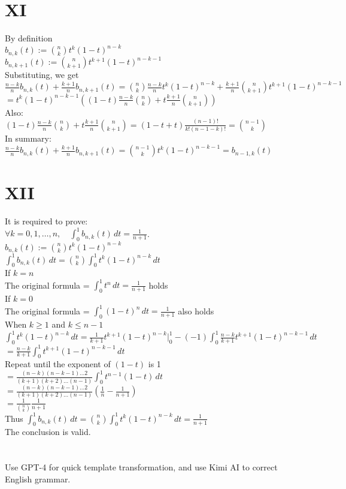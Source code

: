 \documentclass[a4paper]{article}
\begin{document}
\section*{XI}
By definition\\
\( b_{n,k}(t) := \binom{n}{k} t^k (1-t)^{n-k} \)\\
\( b_{n,k+1}(t) := \binom{n}{k+1} t^{k+1} (1-t)^{n-k-1} \)\\
Substituting, we get\\
\( \frac{n-k}{n} b_{n,k}(t) + \frac{k+1}{n} b_{n,k+1}(t) = \binom{n}{k} \frac{n-k}{n} t^k (1-t)^{n-k} + \frac{k+1}{n} \binom{n}{k+1} t^{k+1} (1-t)^{n-k-1} \)\\
\( = t^k (1-t)^{n-k-1} \left((1-t) \frac{n-k}{n} \binom{n}{k} + t \frac{k+1}{n} \binom{n}{k+1}\right) \)\\
Also:\\
\( (1-t) \frac{n-k}{n} \binom{n}{k} + t \frac{k+1}{n} \binom{n}{k+1} = (1-t+t) \frac{(n-1)!}{k!(n-1-k)!} = \binom{n-1}{k} \)\\
In summary:\\
\( \frac{n-k}{n} b_{n,k}(t) + \frac{k+1}{n} b_{n,k+1}(t) = \binom{n-1}{k} t^k (1-t)^{n-k-1} = b_{n-1,k}(t) \)\\

\section*{XII}
It is required to prove:\\
\( \forall k = 0, 1, \ldots, n, \quad \int_{0}^{1} b_{n,k}(t) \, dt = \frac{1}{n+1} \).\\
\( b_{n,k}(t) := \binom{n}{k} t^k (1-t)^{n-k} \)\\
\( \int_{0}^{1} b_{n,k}(t) \, dt = \binom{n}{k} \int_{0}^{1} t^k (1-t)^{n-k} \, dt \)\\
If \( k = n \)\\
The original formula = \( \int_{0}^{1} t^n \, dt = \frac{1}{n+1} \) holds\\
If \( k = 0 \)\\
The original formula = \( \int_{0}^{1} (1-t)^n \, dt = \frac{1}{n+1} \) also holds\\
When \( k \geq 1 \) and \( k \leq n-1 \)\\
\( \int_{0}^{1} t^k (1-t)^{n-k} \, dt = \frac{1}{k+1} t^{k+1} (1-t)^{n-k} \bigg|_{0}^1 - (-1) \int_{0}^{1} \frac{n-k}{k+1} t^{k+1} (1-t)^{n-k-1} \, dt \)\\
\( = \frac{n-k}{k+1} \int_{0}^{1} t^{k+1} (1-t)^{n-k-1} \, dt \)\\
Repeat until the exponent of \( (1-t) \) is 1\\
\( = \frac{(n-k)(n-k-1) \ldots 2}{(k+1)(k+2) \ldots (n-1)} \int_{0}^{1} t^{n-1} (1-t) \, dt \)\\
\( = \frac{(n-k)(n-k-1) \ldots 2}{(k+1)(k+2) \ldots (n-1)} \left( \frac{1}{n} - \frac{1}{n+1} \right) \)\\
\( = \frac{1}{\binom{n}{k}} \frac{1}{n+1} \)\\
Thus \( \int_{0}^{1} b_{n,k}(t) \, dt = \binom{n}{k} \int_{0}^{1} t^k (1-t)^{n-k} \, dt = \frac{1}{n+1} \)\\
The conclusion is valid.\\




\section*{  }
Use GPT-4 for quick template transformation, and use Kimi AI to correct English grammar.
\end{document}
